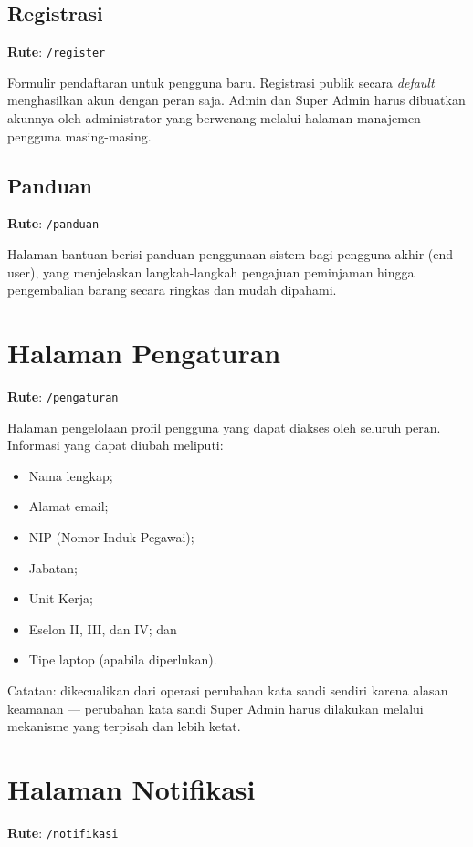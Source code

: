 \documentclass[
  12pt,
  a4paper,
  oneside,
  final
]{report}
\begin{document}
\subsection{Registrasi}
\textbf{Rute}: \texttt{/register}

Formulir pendaftaran untuk pengguna baru. Registrasi publik
secara {\it default} menghasilkan akun dengan peran
{\rolePeminjam} saja. Admin dan Super Admin harus dibuatkan
akunnya oleh administrator yang berwenang melalui halaman
manajemen pengguna masing-masing.

\subsection{Panduan}
\textbf{Rute}: \texttt{/panduan}

Halaman bantuan berisi panduan penggunaan sistem bagi pengguna
akhir (end-user), yang menjelaskan langkah-langkah pengajuan
peminjaman hingga pengembalian barang secara ringkas dan mudah
dipahami.

\section{Halaman Pengaturan}
\textbf{Rute}: \texttt{/pengaturan}

Halaman pengelolaan profil pengguna yang dapat diakses oleh
seluruh peran. Informasi yang dapat diubah meliputi:
\begin{itemize}
  \item Nama lengkap;
  \item Alamat email;
  \item NIP (Nomor Induk Pegawai);
  \item Jabatan;
  \item Unit Kerja;
  \item Eselon II, III, dan IV; dan
  \item Tipe laptop (apabila diperlukan).
\end{itemize}

Catatan: {\roleSuperAdmin} dikecualikan dari operasi perubahan
kata sandi sendiri karena alasan keamanan --- perubahan kata
sandi Super Admin harus dilakukan melalui mekanisme yang
terpisah dan lebih ketat.

\section{Halaman Notifikasi}
\textbf{Rute}: \texttt{/notifikasi}
\end{document}
